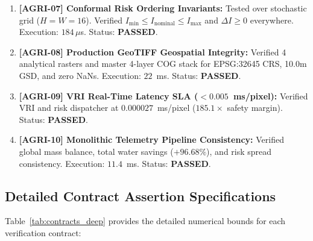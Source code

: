 \documentclass[11pt,a4paper]{article}
\theoremstyle{definition}
\theoremstyle{remark}
\begin{document}
\begin{enumerate}
    \item \textbf{[AGRI-07] Conformal Risk Ordering Invariants:} Tested over stochastic grid ($H=W=16$). Verified $I_{\min} \le I_{\text{nominal}} \le I_{\max}$ and $\Delta I \ge 0$ everywhere. Execution: $184\,\mu$s. Status: \textbf{PASSED}.
    \item \textbf{[AGRI-08] Production GeoTIFF Geospatial Integrity:} Verified 4 analytical rasters and master 4-layer COG stack for EPSG:32645 CRS, 10.0m GSD, and zero NaNs. Execution: $22$~ms. Status: \textbf{PASSED}.
    \item \textbf{[AGRI-09] VRI Real-Time Latency SLA ($< 0.005$~ms/pixel):} Verified VRI and risk dispatcher at $0.000027$~ms/pixel ($185.1\times$ safety margin). Status: \textbf{PASSED}.
    \item \textbf{[AGRI-10] Monolithic Telemetry Pipeline Consistency:} Verified global mass balance, total water savings ($+96.68\%$), and risk spread consistency. Execution: $11.4$~ms. Status: \textbf{PASSED}.
\end{enumerate}

\subsection{Detailed Contract Assertion Specifications}
Table~\ref{tab:contracts_deep} provides the detailed numerical bounds for each verification contract:
\end{document}
